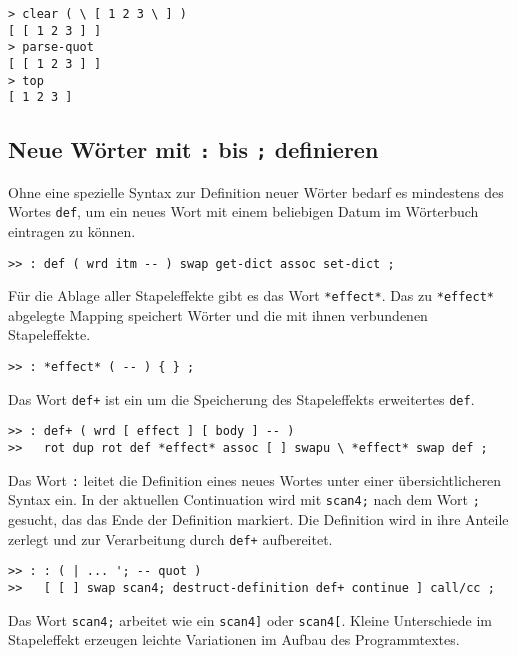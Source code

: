\begin{verbatim}
> clear ( \ [ 1 2 3 \ ] )
[ [ 1 2 3 ] ]
> parse-quot
[ [ 1 2 3 ] ]
> top
[ 1 2 3 ]
\end{verbatim}

\subsection{Neue Wörter mit \texttt{:} bis \texttt{;} definieren}
\label{Sec:DefWords}

Ohne eine spezielle Syntax zur Definition neuer Wörter bedarf es mindestens des Wortes \verb|def|, um ein neues Wort mit einem beliebigen Datum im Wörterbuch eintragen zu können.

\begin{verbatim}
>> : def ( wrd itm -- ) swap get-dict assoc set-dict ;
\end{verbatim}

Für die Ablage aller Stapeleffekte gibt es das Wort \verb|*effect*|. Das zu \verb|*effect*| abgelegte Mapping speichert Wörter und die mit ihnen verbundenen Stapeleffekte.

\begin{verbatim}
>> : *effect* ( -- ) { } ; 
\end{verbatim}

Das Wort \verb|def+| ist ein um die Speicherung des Stapeleffekts erweitertes \verb|def|.

\begin{verbatim}      
>> : def+ ( wrd [ effect ] [ body ] -- )
>>   rot dup rot def *effect* assoc [ ] swapu \ *effect* swap def ;
\end{verbatim}

Das Wort \verb|:| leitet die Definition eines neues Wortes unter einer über\-sicht\-lich\-er\-en Syntax ein. In der aktuellen Continuation wird mit \verb|scan4;| nach dem Wort \verb|;| gesucht, das das Ende der Definition markiert. Die Definition wird in ihre Anteile zerlegt und zur Verarbeitung durch \verb|def+| aufbereitet.

\begin{verbatim}
>> : : ( | ... '; -- quot ) 
>>   [ [ ] swap scan4; destruct-definition def+ continue ] call/cc ;
\end{verbatim}

Das Wort \verb|scan4;| arbeitet wie ein \verb|scan4]| oder \verb|scan4[|. Kleine Unterschiede im Stapeleffekt erzeugen leichte Variationen im Aufbau des Programmtextes.

